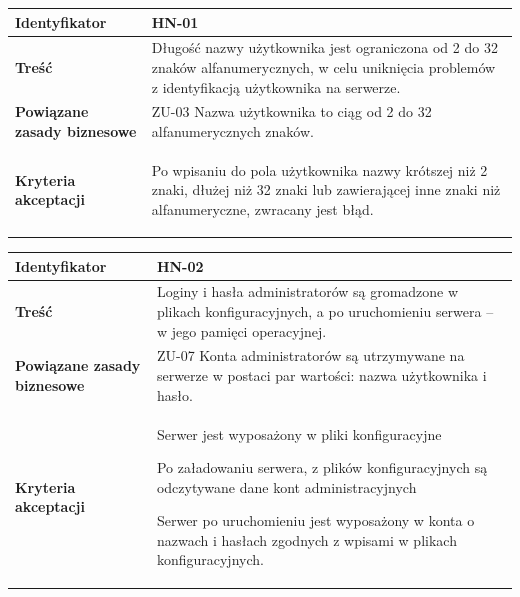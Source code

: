 \leavevmode\hbox{}

\begin{tabular}{ | l | l | }
	\hline
		\textbf{Identyfikator} &
		HN-01
		\\

	\hline
		\textbf{Treść} & \parbox[t]{11.5cm}{\strut
			Długość nazwy użytkownika jest ograniczona od 2 do 32 znaków alfanumerycznych, w celu uniknięcia problemów z identyfikacją użytkownika na serwerze.
		\strut}\\

	\hline
		\parbox[t]{4cm}{\textbf{Powiązane zasady biznesowe}} & \parbox[t]{11.5cm}{\strut
			ZU-03 Nazwa użytkownika to ciąg od 2 do 32 alfanumerycznych znaków.
		\strut}\\

	\hline
		\parbox[t]{4cm}{\textbf{Kryteria akceptacji}} & \parbox[t]{11.5cm}{\strut
			\begin{enumreq}
				\item Po wpisaniu do pola użytkownika nazwy krótszej niż 2 znaki, dłużej niż 32 znaki lub zawierającej inne znaki niż alfanumeryczne, zwracany jest błąd.
			\end{enumreq}
			\strut}
		\\

	\hline
\end{tabular}

\vspace{1em}

\begin{tabular}{ | l | l | }
	\hline
		\textbf{Identyfikator} &
		HN-02
		\\

	\hline
		\textbf{Treść} & \parbox[t]{11.5cm}{\strut
			Loginy i hasła administratorów są gromadzone w plikach
      konfiguracyjnych, a po uruchomieniu serwera -- w jego
      pamięci operacyjnej.
		\strut}\\

	\hline
		\parbox[t]{4cm}{\textbf{Powiązane zasady biznesowe}} & \parbox[t]{11.5cm}{\strut
			ZU-07 Konta administratorów są utrzymywane na serwerze w postaci par wartości: nazwa użytkownika i hasło.
		\strut}\\

	\hline
		\parbox[t]{4cm}{\textbf{Kryteria akceptacji}} & \parbox[t]{11.5cm}{\strut
			\begin{enumreq}
				\item Serwer jest wyposażony w pliki konfiguracyjne
        \item Po załadowaniu serwera, z plików konfiguracyjnych
        są odczytywane dane kont administracyjnych
        \item Serwer po uruchomieniu jest wyposażony w konta o
        nazwach i hasłach zgodnych z wpisami w plikach konfiguracyjnych.
			\end{enumreq}
			\strut}
		\\

	\hline
\end{tabular}

